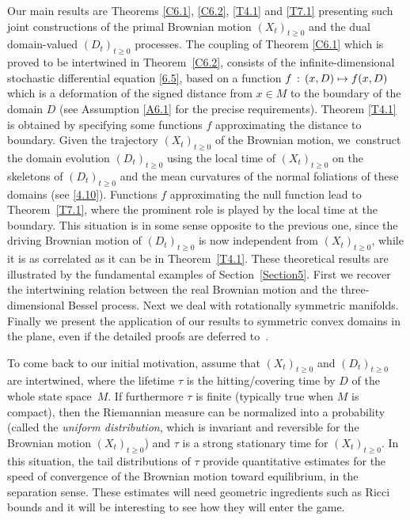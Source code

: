 \documentclass[10pt]{amsart}
\newcommand\mto{\mathchoice{\longmapsto}{\mapsto}{\mapsto}{\mapsto}}
\theoremstyle{plain}
\theoremstyle{definition}
\newcommand{\st}{\,:\,}
\begin{document}
Our main results are Theorems \ref{C6.1}, \ref{C6.2}, \ref{T4.1} and \ref{T7.1} presenting such joint constructions of the primal Brownian motion $(X_t)_{t\geq 0}$ and the dual domain-valued $(D_t)_{t\geq 0}$ processes.
The coupling of Theorem \ref{C6.1} which is proved to be intertwined in Theorem~\ref{C6.2}, consists of the infinite-dimensional stochastic differential equation \eqref{6.5}, based on a function $f\st(x,D)\mto f(x,D)$ which is a deformation of the signed distance from $x\in M$ to the boundary of the domain $D$ (see Assumption \eqref{A6.1} for the precise requirements).
Theorem \ref{T4.1} is obtained by specifying some functions $f$ approx\-imating the distance to boundary. Given the trajectory $(X_t)_{t\geq 0}$ of the Brownian motion, we~construct the domain evolution
$(D_t)_{t\geq 0}$ using the local time of $(X_t)_{t\geq 0}$ on the skeletons of $(D_t)_{t\geq 0}$ and the mean curvatures of the normal foliations of these domains (see \eqref{4.10}). Functions $f$ approximating the null function lead to Theorem~\ref{T7.1}, where the prominent role is played by the local time at the boundary.
This situation is in some sense opposite to the previous one, since
the driving Brownian motion of $(D_t)_{t\geq 0}$ is now independent from $(X_t)_{t\geq 0}$, while it is as correlated as it can be in Theorem~\ref{T4.1}.
These theoretical results are illustrated by the fundamental examples of Section~\ref{Section5}. First we recover the intertwining relation between the real Brownian motion and the three-dimensional Bessel process. Next we deal with rota\-tionally symmetric manifolds.
Finally we present the application of our results to symmetric convex domains in the plane, even if the detailed proofs are deferred to~\cite{ACM:21}.
\par
To come back to our initial motivation,
assume that $(X_t)_{t\geq 0}$ and $(D_t)_{t\geq 0}$ are inter\-twined, where the lifetime $\tau$ is the hitting/covering time by $D$ of the whole state space~$M$.
If furthermore $\tau$ is finite (typically true when $M$ is compact), then the Riemannian measure can be normalized into a probability (called the \emph{uniform distribution}, which is invariant and reversible for the Brownian motion $(X_t)_{t\geq 0}$) and $\tau$ is a strong stationary time for $(X_t)_{t\geq 0}$. In this situation, the tail distributions of $\tau$ provide quantitative estimates for the speed of convergence of the Brownian motion toward equilibrium, in the separation sense. These estimates will need geometric ingredients such as Ricci bounds and it will be interesting to see how they will enter the game.
\end{document}

